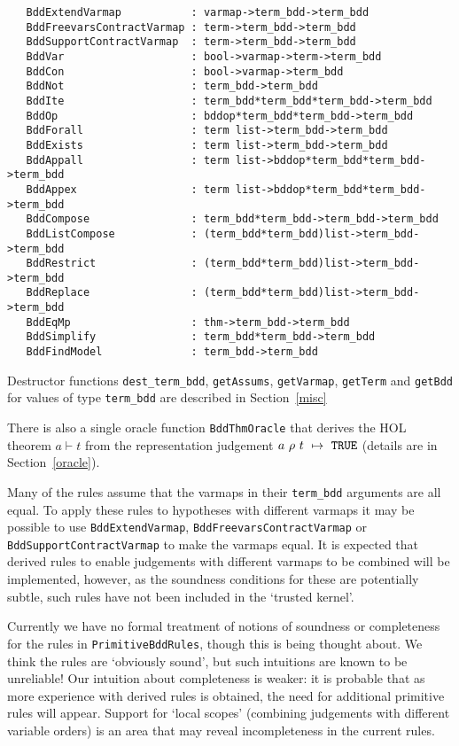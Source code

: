 \documentclass[12pt]{article}
\renewcommand{\t}[1]{\mbox{\tt #1}}
\newcommand{\ml}[1]{{\tt #1}}
\newcommand{\termbdd}[4]{\mbox{$#1~#2~#3~\mapsto~#4$}}
\newcommand\termbddty{\texttt{term\_bdd}\xspace}
\begin{document}
{\footnotesize\baselineskip 10pt\begin{verbatim}
   BddExtendVarmap           : varmap->term_bdd->term_bdd
   BddFreevarsContractVarmap : term->term_bdd->term_bdd
   BddSupportContractVarmap  : term->term_bdd->term_bdd
   BddVar                    : bool->varmap->term->term_bdd
   BddCon                    : bool->varmap->term_bdd
   BddNot                    : term_bdd->term_bdd
   BddIte                    : term_bdd*term_bdd*term_bdd->term_bdd
   BddOp                     : bddop*term_bdd*term_bdd->term_bdd
   BddForall                 : term list->term_bdd->term_bdd
   BddExists                 : term list->term_bdd->term_bdd
   BddAppall                 : term list->bddop*term_bdd*term_bdd->term_bdd
   BddAppex                  : term list->bddop*term_bdd*term_bdd->term_bdd
   BddCompose                : term_bdd*term_bdd->term_bdd->term_bdd
   BddListCompose            : (term_bdd*term_bdd)list->term_bdd->term_bdd
   BddRestrict               : (term_bdd*term_bdd)list->term_bdd->term_bdd
   BddReplace                : (term_bdd*term_bdd)list->term_bdd->term_bdd
   BddEqMp                   : thm->term_bdd->term_bdd
   BddSimplify               : term_bdd*term_bdd->term_bdd
   BddFindModel              : term_bdd->term_bdd
\end{verbatim}}

Destructor functions \t{dest\_term\_bdd}, \t{getAssums}, \t{getVarmap}, \t{getTerm}
and \t{getBdd} for values of type \termbddty are described in Section~\ref{misc}

There is also a single oracle function
\t{BddThmOracle} that derives the HOL theorem $a \vdash t$
from the representation judgement \termbdd{a}{\rho}{t}{\ml{TRUE}}
(details are in Section~\ref{oracle}).

Many of the rules assume that the varmaps in their \termbddty
arguments are all equal. To apply these rules to hypotheses with
different varmaps it may be possible to use \t{BddExtendVarmap},
\t{BddFreevarsContractVarmap} or \t{BddSupportContractVarmap} to make
the varmaps equal.  It is expected that derived rules to enable
judgements with different varmaps to be combined will be implemented,
however, as the soundness conditions for these are potentially subtle,
such rules have not been included in the `trusted kernel'.

Currently we have no formal treatment of notions of soundness or
completeness for the rules in \t{PrimitiveBddRules}, though this is
being thought about. We think the rules are `obviously sound', but
such intuitions are known to be unreliable! Our intuition about
completeness is weaker: it is probable that as more experience with
derived rules is obtained, the need for additional primitive rules
will appear. Support for `local scopes' (combining judgements with
different variable orders) is an area that may reveal incompleteness
in the current rules.
\end{document}
